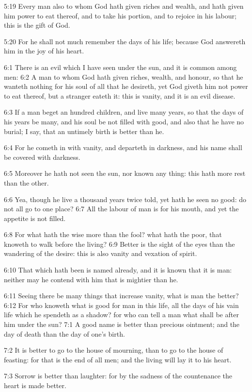 5:19 Every man also to whom God hath given riches and wealth, and hath given him power to eat thereof, and to take his portion, and to rejoice in his labour; this is the gift of God.

5:20 For he shall not much remember the days of his life; because God answereth him in the joy of his heart.

6:1 There is an evil which I have seen under the sun, and it is common among men: 6:2 A man to whom God hath given riches, wealth, and honour, so that he wanteth nothing for his soul of all that he desireth, yet God giveth him not power to eat thereof, but a stranger eateth it: this is vanity, and it is an evil disease.

6:3 If a man beget an hundred children, and live many years, so that the days of his years be many, and his soul be not filled with good, and also that he have no burial; I say, that an untimely birth is better than he.

6:4 For he cometh in with vanity, and departeth in darkness, and his name shall be covered with darkness.

6:5 Moreover he hath not seen the sun, nor known any thing: this hath more rest than the other.

6:6 Yea, though he live a thousand years twice told, yet hath he seen no good: do not all go to one place?  6:7 All the labour of man is for his mouth, and yet the appetite is not filled.

6:8 For what hath the wise more than the fool? what hath the poor, that knoweth to walk before the living?  6:9 Better is the sight of the eyes than the wandering of the desire: this is also vanity and vexation of spirit.

6:10 That which hath been is named already, and it is known that it is man: neither may he contend with him that is mightier than he.

6:11 Seeing there be many things that increase vanity, what is man the better?  6:12 For who knoweth what is good for man in this life, all the days of his vain life which he spendeth as a shadow? for who can tell a man what shall be after him under the sun?  7:1 A good name is better than precious ointment; and the day of death than the day of one's birth.

7:2 It is better to go to the house of mourning, than to go to the house of feasting: for that is the end of all men; and the living will lay it to his heart.

7:3 Sorrow is better than laughter: for by the sadness of the countenance the heart is made better.

